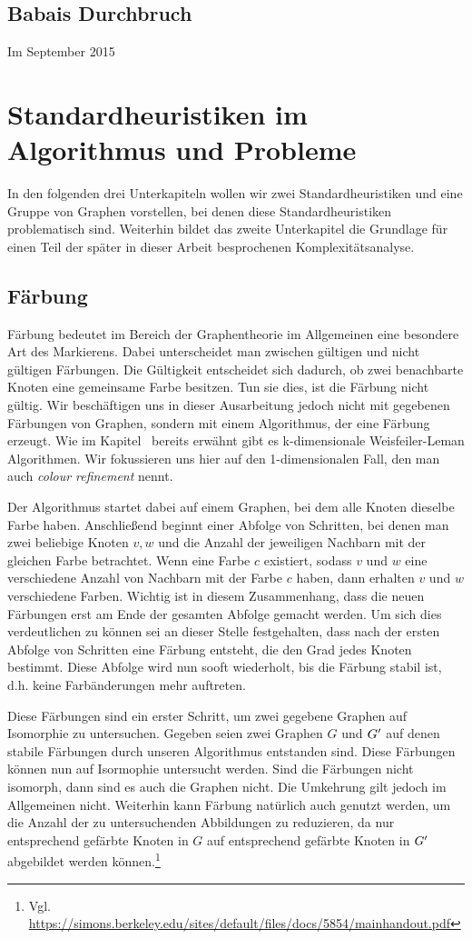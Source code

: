 \documentclass[a4paper]{article}
\newcommand{\wlcoloring}{\url{https://simons.berkeley.edu/sites/default/files/docs/5854/mainhandout.pdf}}
\begin{document}
\subsection{Babais Durchbruch}

Im September 2015
\section{Standardheuristiken im Algorithmus und Probleme}
In den folgenden drei Unterkapiteln wollen wir zwei Standardheuristiken und eine Gruppe von Graphen vorstellen, bei denen diese Standardheuristiken problematisch sind. Weiterhin bildet das zweite Unterkapitel die Grundlage für einen Teil der später in dieser Arbeit besprochenen Komplexitätsanalyse.

\subsection{Färbung}
Färbung bedeutet im Bereich der Graphentheorie im Allgemeinen eine besondere Art des Markierens. Dabei unterscheidet man zwischen gültigen und nicht gültigen Färbungen. Die Gültigkeit entscheidet sich dadurch, ob zwei benachbarte Knoten eine gemeinsame Farbe besitzen. Tun sie dies, ist die Färbung nicht gültig. Wir beschäftigen uns in dieser Ausarbeitung jedoch nicht mit gegebenen Färbungen von Graphen, sondern mit einem Algorithmus, der eine Färbung erzeugt. Wie im Kapitel \glqq{}\grqq\ bereits erwähnt gibt es k-dimensionale Weisfeiler-Leman Algorithmen. Wir fokussieren uns hier auf den 1-dimensionalen Fall, den man auch \emph{colour refinement} nennt.

Der Algorithmus startet dabei auf einem Graphen, bei dem alle Knoten dieselbe Farbe haben. Anschließend beginnt einer Abfolge von Schritten, bei denen man zwei beliebige Knoten $v, w$ und die Anzahl der jeweiligen Nachbarn mit der gleichen Farbe betrachtet. Wenn eine Farbe $c$ existiert, sodass $v$ und $w$ eine verschiedene Anzahl von Nachbarn mit der Farbe $c$ haben, dann erhalten $v$ und $w$ verschiedene Farben. Wichtig ist in diesem Zusammenhang, dass die neuen Färbungen erst am Ende der gesamten Abfolge gemacht werden. Um sich dies verdeutlichen zu können sei an dieser Stelle festgehalten, dass nach der ersten Abfolge von Schritten eine Färbung entsteht, die den Grad jedes Knoten bestimmt. Diese Abfolge wird nun sooft wiederholt, bis die Färbung stabil ist, d.h. keine Farbänderungen mehr auftreten. 

Diese Färbungen sind ein erster Schritt, um zwei gegebene Graphen auf Isomorphie zu untersuchen. Gegeben seien zwei Graphen $G$ und $G\rq{}$ auf denen stabile Färbungen durch unseren Algorithmus entstanden sind. Diese Färbungen können nun auf Isormophie untersucht werden. Sind die Färbungen nicht isomorph, dann sind es auch die Graphen nicht. Die Umkehrung gilt jedoch im Allgemeinen nicht. Weiterhin kann Färbung natürlich auch genutzt werden, um die Anzahl der zu untersuchenden Abbildungen zu reduzieren, da nur entsprechend gefärbte Knoten in $G$ auf entsprechend gefärbte Knoten in $G\rq{}$ abgebildet werden können.\footnote{Vgl. \wlcoloring} 
\end{document}
